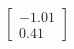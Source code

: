\documentclass[preview]{standalone}
\begin{document}
\begin{align*}
\begin{bmatrix} -1.01 \\ 0.41 \end{bmatrix}
\end{align*}
\end{document}
